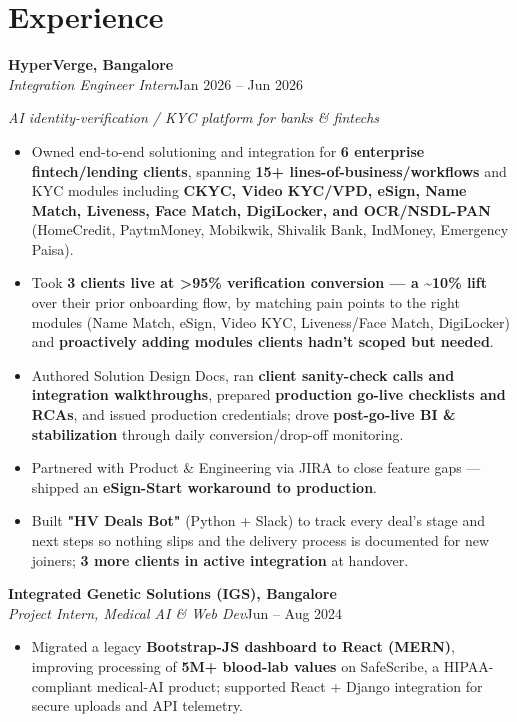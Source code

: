 \documentclass[10pt,a4paper]{article}
\begin{document}
\section*{Experience}
\vspace{1pt}\textbf{HyperVerge, Bangalore}\\
\textit{Integration Engineer Intern}\hfill Jan 2026 -- Jun 2026\par\vspace{1pt}
{\small\itshape AI identity-verification / KYC platform for banks \& fintechs}\par\vspace{1pt}
\begin{itemize}
\item Owned end-to-end solutioning and integration for \textbf{6 enterprise fintech/lending clients}, spanning \textbf{15+ lines-of-business/workflows} and KYC modules including \textbf{CKYC, Video KYC/VPD, eSign, Name Match, Liveness, Face Match, DigiLocker, and OCR/NSDL-PAN} (HomeCredit, PaytmMoney, Mobikwik, Shivalik Bank, IndMoney, Emergency Paisa).
\item Took \textbf{3 clients live at \textgreater{}95\% verification conversion --- a \textasciitilde{}10\% lift} over their prior onboarding flow, by matching pain points to the right modules (Name Match, eSign, Video KYC, Liveness/Face Match, DigiLocker) and \textbf{proactively adding modules clients hadn't scoped but needed}.
\item Authored Solution Design Docs, ran \textbf{client sanity-check calls and integration walkthroughs}, prepared \textbf{production go-live checklists and RCAs}, and issued production credentials; drove \textbf{post-go-live BI \& stabilization} through daily conversion/drop-off monitoring.
\item Partnered with Product \& Engineering via JIRA to close feature gaps --- shipped an \textbf{eSign-Start workaround to production}.
\item Built \textbf{"HV Deals Bot"} (Python + Slack) to track every deal's stage and next steps so nothing slips and the delivery process is documented for new joiners; \textbf{3 more clients in active integration} at handover.
\end{itemize}
\vspace{1pt}\textbf{Integrated Genetic Solutions (IGS), Bangalore}\\
\textit{Project Intern, Medical AI \& Web Dev}\hfill Jun -- Aug 2024\par\vspace{1pt}
\begin{itemize}
\item Migrated a legacy \textbf{Bootstrap-JS dashboard to React (MERN)}, improving processing of \textbf{5M+ blood-lab values} on SafeScribe, a HIPAA-compliant medical-AI product; supported React + Django integration for secure uploads and API telemetry.
\end{itemize}
\end{document}

